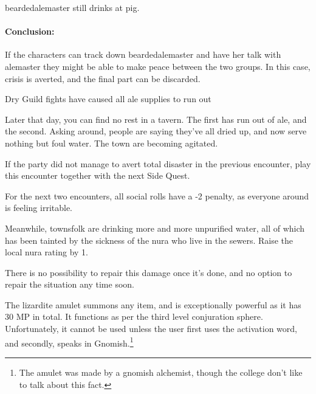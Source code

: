 \begin{multicols}{2}

\Gls{beardedalemaster} still drinks at \gls{pig}.  

\paragraph{Conclusion:} If the characters can track down \gls{beardedalemaster} and have her talk with \gls{alemaster} they might be able to make peace between the two groups.
In this case, crisis is averted, and the final part can be discarded.

\beardedalemaster

{\N Dry}%
{Guild fights have caused all ale supplies to run out}%

\begin{boxtext}

	Later that day, you can find no rest in a tavern.  The first has run out of ale, and the second.  Asking around, people are saying they've all dried up, and now serve nothing but foul water.  The town are becoming agitated.

\end{boxtext}

If the party did not manage to avert total disaster in the previous encounter, play this encounter together with the next Side Quest.

For the next two encounters, all social rolls have a -2 penalty, as everyone around is feeling irritable.

Meanwhile, townsfolk are drinking more and more unpurified water, all of which has been tainted by the sickness of the nura who live in the sewers.  Raise the local nura rating by 1.

There is no possibility to repair this damage once it's done, and no option to repair the situation any time soon.

\stopcontents[sq]



\resumecontents[Villages]
\label{lizardite}
\stopcontents[Villages]

\startcontents[sq]

\sqminitoc

\noindent
The lizardite amulet summons any item, and is exceptionally powerful as it has 30 MP in total.  It functions as per the third level conjuration sphere.  Unfortunately, it cannot be used unless the user first uses the activation word, and secondly, speaks in Gnomish.\footnote{The amulet was made by a gnomish alchemist, though the college don't like to talk about this fact.}


\end{multicols}
